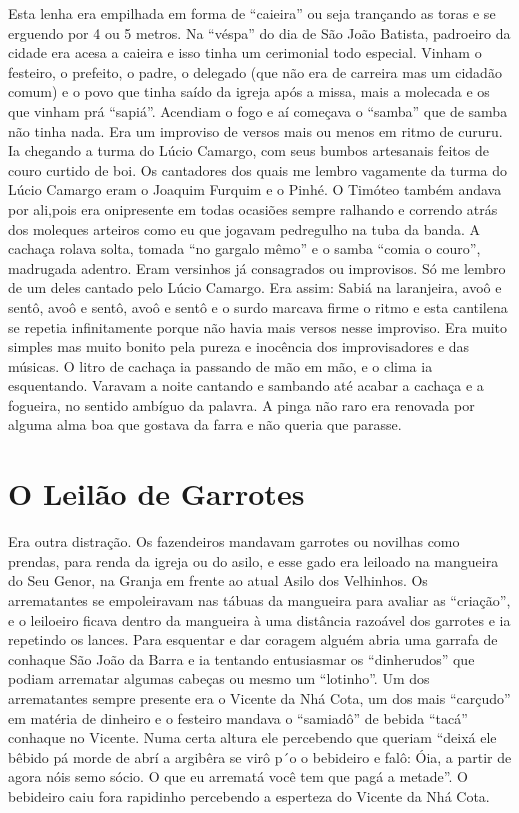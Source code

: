 \documentclass[12pt,brazil,]{book}
\begin{document}
Esta lenha era empilhada em forma de ``caieira'' ou seja trançando as
toras e se erguendo por 4 ou 5 metros. Na ``véspa'' do dia de São João
Batista, padroeiro da cidade era acesa a caieira e isso tinha um
cerimonial todo especial. Vinham o festeiro, o prefeito, o padre, o
delegado (que não era de carreira mas um cidadão comum) e o povo que
tinha saído da igreja após a missa, mais a molecada e os que vinham prá
``sapiá''. Acendiam o fogo e aí começava o ``samba'' que de samba não
tinha nada. Era um improviso de versos mais ou menos em ritmo de cururu.
Ia chegando a turma do Lúcio Camargo, com seus bumbos artesanais feitos
de couro curtido de boi. Os cantadores dos quais me lembro vagamente da
turma do Lúcio Camargo eram o Joaquim Furquim e o Pinhé. O Timóteo
também andava por ali,pois era onipresente em todas ocasiões sempre
ralhando e correndo atrás dos moleques arteiros como eu que jogavam
pedregulho na tuba da banda. A cachaça rolava solta, tomada ``no gargalo
mêmo'' e o samba ``comia o couro'', madrugada adentro. Eram versinhos já
consagrados ou improvisos. Só me lembro de um deles cantado pelo Lúcio
Camargo. Era assim: Sabiá na laranjeira, avoô e sentô, avoô e sentô,
avoô e sentô e o surdo marcava firme o ritmo e esta cantilena se repetia
infinitamente porque não havia mais versos nesse improviso. Era muito
simples mas muito bonito pela pureza e inocência dos improvisadores e
das músicas. O litro de cachaça ia passando de mão em mão, e o clima ia
esquentando. Varavam a noite cantando e sambando até acabar a cachaça e
a fogueira, no sentido ambíguo da palavra. A pinga não raro era renovada
por alguma alma boa que gostava da farra e não queria que parasse.

\section{O Leilão de Garrotes}\label{o-leiluxe3o-de-garrotes}

Era outra distração. Os fazendeiros mandavam garrotes ou novilhas como
prendas, para renda da igreja ou do asilo, e esse gado era leiloado na
mangueira do Seu Genor, na Granja em frente ao atual Asilo dos
Velhinhos. Os arrematantes se empoleiravam nas tábuas da mangueira para
avaliar as ``criação'', e o leiloeiro ficava dentro da mangueira à uma
distância razoável dos garrotes e ia repetindo os lances. Para esquentar
e dar coragem alguém abria uma garrafa de conhaque São João da Barra e
ia tentando entusiasmar os ``dinherudos'' que podiam arrematar algumas
cabeças ou mesmo um ``lotinho''. Um dos arrematantes sempre presente era
o Vicente da Nhá Cota, um dos mais ``carçudo'' em matéria de dinheiro e
o festeiro mandava o ``samiadô'' de bebida ``tacá'' conhaque no Vicente.
Numa certa altura ele percebendo que queriam ``deixá ele bêbido pá morde
de abrí a argibêra se virô p´o o bebideiro e falô: Óia, a partir de
agora nóis semo sócio. O que eu arrematá você tem que pagá a metade''. O
bebideiro caiu fora rapidinho percebendo a esperteza do Vicente da Nhá
Cota.
\end{document}
